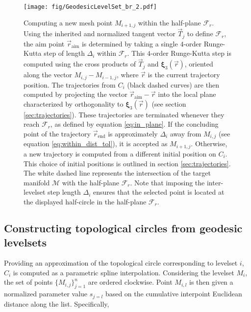 \begin{figure}[h!] 
\centering
\texttt{[image: fig/GeodesicLevelSet\_br\_2.pdf]}
\caption{Computing a new mesh point $M_{i+1,j}$ within the half-plane $\mathcal{F}_r$. Using the inherited and normalized tangent vector $\vec{T}_j$ to define $\mathcal{F}_r$, the aim point $\vec{r}_{\text{aim}}$ is determined by taking a single $4$-order Runge-Kutta step of length $\Delta_i$ within $\mathcal{F}_r$. This $4$-order Runge-Kutta step is computed using the cross products of $\vec{T}_j$ and $\bm{\xi}_3(\vec{r})$, oriented along the vector $M_{i,j}-M_{i-1,j}$, where $\vec{r}$ is the current trajectory position. The trajectories from $C_i$ (black dashed curves) are then computed by projecting the vector $\vec{r}_{\text{aim}}-\vec{r}$ into the local plane characterized by orthogonality to $\bm{\xi}_3(\vec{r})$ (see section \ref{sec:trajectories}). These trajectories are terminated whenever they reach $\mathcal{F}_r$, as defined by equation \eqref{eq:in_plane}. If the concluding point of the trajectory $\vec{r}_{\text{end}}$ is approximately $\Delta_i$ away from $M_{i,j}$ (see equation \eqref{eq:within_dist_tol}), it is accepted as $M_{i+1,j}$. Otherwise, a new trajectory is computed from a different initial position on $C_i$. This choice of initial positions is outlined in section \ref{sec:trajectories}. The white dashed line represents the intersection of the target manifold $\mathcal{M}$ with the half-plane $\mathcal{F}_r$. Note that imposing the inter-levelset step length $\Delta_i$ ensures that the selected point is located at the displayed half-circle in the half-plane $\mathcal{F}_r$.}\label{fig:GeodesicLevelSet_br}
\end{figure}


\subsection{Constructing topological circles from geodesic levelsets}\label{sec:topological_circles}

Providing an approximation of the topological circle corresponding to levelset $i$, $C_i$ is computed as a parametric spline interpolation. Considering the levelset $M_i$, the set of points $\{M_{i,j}\}_{j=1}^n$ are ordered clockwise. Point $M_{i,l}$ is then given a normalized parameter value $s_{j=l}$ based on the cumulative interpoint Euclidean distance along the list. Specifically,

